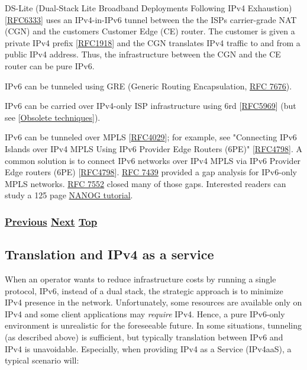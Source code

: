 \documentclass[
]{article}
\begin{document}
DS-Lite (Dual-Stack Lite Broadband Deployments Following IPv4
Exhaustion)
{[}\href{https://www.rfc-editor.org/info/rfc6333}{RFC6333}{]} uses an
IPv4-in-IPv6 tunnel between the the ISP\textquotesingle s carrier-grade
NAT (CGN) and the customer\textquotesingle s Customer Edge (CE) router.
The customer is given a private IPv4 prefix
{[}\href{https://www.rfc-editor.org/info/rfc1918}{RFC1918}{]} and the
CGN translates IPv4 traffic to and from a public IPv4 address. Thus, the
infrastructure between the CGN and the CE router can be pure IPv6.

IPv6 can be tunneled using GRE (Generic Routing Encapsulation,
\href{https://www.rfc-editor.org/info/rfc7676}{RFC 7676}).

IPv6 can be carried over IPv4-only ISP infrastructure using 6rd
{[}\href{https://www.rfc-editor.org/info/rfc5969}{RFC5969}{]} (but see
{[}\hyperref[obsolete-techniques]{Obsolete techniques}{]}).

IPv6 can be tunneled over MPLS
{[}\href{https://www.rfc-editor.org/info/rfc4029}{RFC4029}{]}; for
example, see "Connecting IPv6 Islands over IPv4 MPLS Using IPv6 Provider
Edge Routers (6PE)"
{[}\href{https://www.rfc-editor.org/info/rfc4798}{RFC4798}{]}. A common
solution is to connect IPv6 networks over IPv4 MPLS via IPv6 Provider
Edge routers (6PE)
{[}\href{https://www.rfc-editor.org/info/rfc4798}{RFC4798}{]}.
\href{https://www.rfc-editor.org/info/rfc7439}{RFC 7439} provided a gap
analysis for IPv6-only MPLS networks.
\href{https://www.rfc-editor.org/info/rfc7552}{RFC 7552} closed many of
those gaps. Interested readers can study a 125 page
\href{https://pc.nanog.org/static/published/meetings/NANOG76/1993/20190612_Agahian_Demystifying_Ipv6_Over_v1.pdf}{NANOG
tutorial}.

\subsubsection{\texorpdfstring{\hyperref[dual-stack-scenarios]{Previous}
\hyperref[translation-and-ipv4-as-a-service]{Next}
\hyperref[coexistence-with-legacy-ipv4]{Top}}{Previous Next Top}}\label{previous-next-top-19}

\pagebreak

\subsection{Translation and IPv4 as a
service}\label{translation-and-ipv4-as-a-service}

When an operator wants to reduce infrastructure costs by running a
single protocol, IPv6, instead of a dual stack, the strategic approach
is to minimize IPv4 presence in the network. Unfortunately, some
resources are available only on IPv4 and some client applications may
\emph{require} IPv4. Hence, a pure IPv6-only environment is unrealistic
for the foreseeable future. In some situations, tunneling (as described
above) is sufficient, but typically translation between IPv6 and IPv4 is
unavoidable. Especially, when providing IPv4 as a Service (IPv4aaS), a
typical scenario will:
\end{document}
